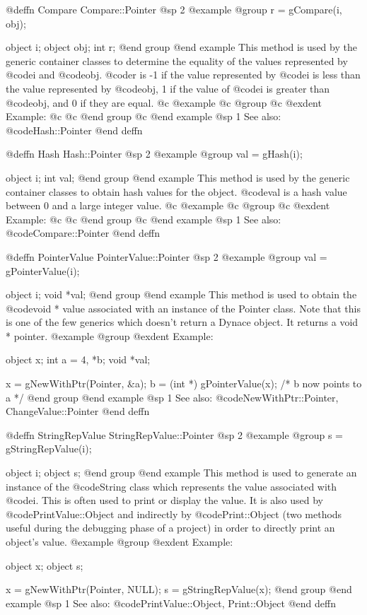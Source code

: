 @deffn {Compare} Compare::Pointer
@sp 2
@example
@group
r = gCompare(i, obj);

object  i;
object  obj;
int     r;
@end group
@end example
This method is used by the generic container classes to determine
the equality of the values represented by @code{i} and @code{obj}. 
@code{r} is -1 if the value represented by @code{i} is less than
the value represented by @code{obj}, 1 if the value of @code{i}
is greater than @code{obj}, and 0 if they are equal.
@c @example
@c @group
@c @exdent Example:
@c
@c @end group
@c @end example
@sp 1
See also:  @code{Hash::Pointer}
@end deffn







@deffn {Hash} Hash::Pointer
@sp 2
@example
@group
val = gHash(i);

object  i;
int     val;
@end group
@end example
This method is used by the generic container classes to obtain hash values
for the object.  @code{val}
is a hash value between 0 and a large integer value.
@c @example
@c @group
@c @exdent Example:
@c
@c @end group
@c @end example
@sp 1
See also:  @code{Compare::Pointer}
@end deffn







@deffn {PointerValue} PointerValue::Pointer
@sp 2
@example
@group
val = gPointerValue(i);

object  i;
void    *val;
@end group
@end example
This method is used to obtain the @code{void *} value associated with an
instance of the Pointer class.  Note that this is one of the few
generics which doesn't return a Dynace object.  It returns a void * pointer.
@example
@group
@exdent Example:

object  x;
int     a = 4, *b;
void    *val;

x = gNewWithPtr(Pointer, &a);
b = (int *) gPointerValue(x);
/*  b now points to a  */
@end group
@end example
@sp 1
See also:  @code{NewWithPtr::Pointer, ChangeValue::Pointer}
@end deffn








@deffn {StringRepValue} StringRepValue::Pointer
@sp 2
@example
@group
s = gStringRepValue(i);

object  i;
object  s;
@end group
@end example
This method is used to generate an instance of the @code{String} class
which represents the value associated with @code{i}.  This is often
used to print or display the value.  It is also used by
@code{PrintValue::Object} and indirectly by @code{Print::Object}
(two methods useful during the debugging phase of a project)
in order to directly print an object's value.
@example
@group
@exdent Example:

object  x;
object  s;

x = gNewWithPtr(Pointer, NULL);
s = gStringRepValue(x);
@end group
@end example
@sp 1
See also:  @code{PrintValue::Object, Print::Object}
@end deffn











